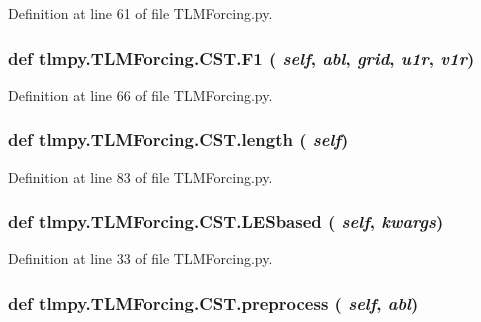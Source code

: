 Definition at line 61 of file TLMForcing.py.\hypertarget{classtlmpy_1_1TLMForcing_1_1CST_ac70b86f07894c455a2de2dabe6874d76}{
\subsubsection[{F1}]{\setlength{\rightskip}{0pt plus 5cm}def tlmpy.TLMForcing.CST.F1 ( {\em self}, \/   {\em abl}, \/   {\em grid}, \/   {\em u1r}, \/   {\em v1r})}}
\label{classtlmpy_1_1TLMForcing_1_1CST_ac70b86f07894c455a2de2dabe6874d76}


Definition at line 66 of file TLMForcing.py.\hypertarget{classtlmpy_1_1TLMForcing_1_1CST_aa3b2106058e72a79d5e4f1ed7b8a1d7e}{
\subsubsection[{length}]{\setlength{\rightskip}{0pt plus 5cm}def tlmpy.TLMForcing.CST.length ( {\em self})}}
\label{classtlmpy_1_1TLMForcing_1_1CST_aa3b2106058e72a79d5e4f1ed7b8a1d7e}


Definition at line 83 of file TLMForcing.py.\hypertarget{classtlmpy_1_1TLMForcing_1_1CST_a3c2e5156d020178cfa3ef221e37d97e9}{
\subsubsection[{LESbased}]{\setlength{\rightskip}{0pt plus 5cm}def tlmpy.TLMForcing.CST.LESbased ( {\em self}, \/   {\em kwargs})}}
\label{classtlmpy_1_1TLMForcing_1_1CST_a3c2e5156d020178cfa3ef221e37d97e9}


Definition at line 33 of file TLMForcing.py.\hypertarget{classtlmpy_1_1TLMForcing_1_1CST_a84092b5feab0b8f3944bb4f4ff971c14}{
\subsubsection[{preprocess}]{\setlength{\rightskip}{0pt plus 5cm}def tlmpy.TLMForcing.CST.preprocess ( {\em self}, \/   {\em abl})}}
\label{classtlmpy_1_1TLMForcing_1_1CST_a84092b5feab0b8f3944bb4f4ff971c14}


